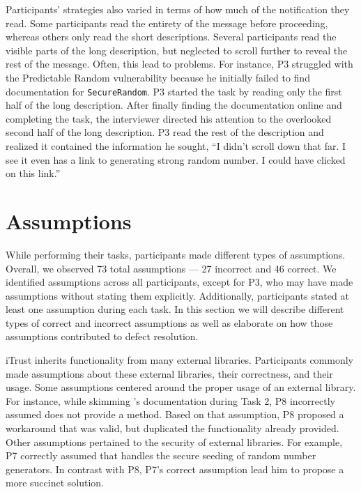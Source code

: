 \documentclass[10pt,journal,compsoc]{IEEEtran}
\begin{document}
Participants' strategies also varied in terms of how much of the notification they read.
Some participants read the entirety of the message before proceeding, whereas others only read the short descriptions. 
Several participants read the visible parts of the long description, but neglected to scroll further to reveal the rest of the message.
Often, this lead to problems. 
For instance, P3 struggled with the Predictable Random vulnerability because he initially failed to find documentation for \texttt{SecureRandom}.
P3 started the task by reading only the first half of the long description.
After finally finding the documentation online and completing the task, the interviewer directed his attention to the overlooked second half of the long description.
P3 read the rest of the description and realized it contained the information he sought,
``I didn't scroll down that far. I see it even has a link to generating strong random number. I could have clicked on this link.'' 


\section{Assumptions}
\label{sec:assumptions}
While performing their tasks, participants made different types of assumptions. 
Overall, we observed 73 total assumptions --- 27 incorrect and 46 correct. 
We identified assumptions across all participants, except for P3, who may have made assumptions without stating them explicitly.
Additionally, participants stated at least one assumption during each task.
In this section we will describe different types of correct and incorrect assumptions as well as elaborate on how those assumptions contributed to defect resolution.

iTrust inherits functionality from many external libraries.
Participants commonly made assumptions about these external libraries, their correctness, and their usage.
Some assumptions centered around the proper usage of an external library. 
For instance, while skimming 's documentation during Task 2, P8 incorrectly assumed  does not provide a  method.
Based on that assumption, P8 proposed a workaround that was valid, but duplicated the functionality  already provided.
Other assumptions pertained to the security of external libraries.
For example, P7 correctly assumed that  handles the secure seeding of random number generators.
In contrast with P8, P7's correct assumption lead him to propose a more succinct solution.
\end{document}
